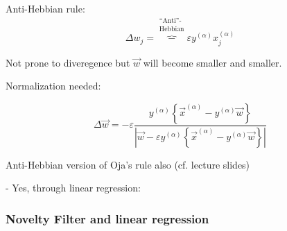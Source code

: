 \begin{frame}\frametitle{\subsubsecname}

	\begin{block}{Anti-Hebbian rule:}
				\begin{equation}
				\Delta w_j = \overbrace{-}^{\substack{	\text{``Anti''-} \\ \text{Hebbian} }} \varepsilon y^{(\alpha)} x_j^{(\alpha)}
				\end{equation}
	\end{block}
	
	Not prone to diveregence but $\vec w$ will become smaller and smaller.
	\pause
	
	Normalization needed:
	
	\begin{equation}
		\Delta \vec{w} = - \varepsilon  \frac{y^{(\alpha)} \left\{ \vec{x}^{(\alpha)} - y^{(\alpha)} \vec{w} \right\}}{|{\vec{w} - \varepsilon y^{(\alpha)} \left\{ \vec{x}^{(\alpha)} - y^{(\alpha)} \vec{w} \right\}}|}
	\end{equation}
	
	Anti-Hebbian version of Oja's rule also (cf. lecture slides)

\end{frame}


\begin{frame}


\pause

- Yes, through linear regression:

\end{frame}

\newpage

\subsubsection{Novelty Filter and linear regression}

